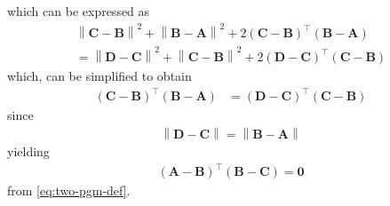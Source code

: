 \documentclass[10pt, a4paper]{article}
\providecommand{\norm}[1]{\left\lVert#1\right\rVert}
\let\vec\mathbf
\begin{document}
which can be expressed as
\begin{multline}
	\norm{\vec{C}-\vec{B}}^2 + \norm{\vec{B}-\vec{A}}^2 + 2(\vec{C}-\vec{B})^{\top} (\vec{B}-\vec{A}) 
	\\
	= \norm{\vec{D}-\vec{C}}^2 + \norm{\vec{C}-\vec{B}}^2+2(\vec{D}-\vec{C})^{\top} (\vec{C}-\vec{B}) 
\end{multline}
which, can be simplified to obtain 
\begin{align}
	(\vec{C}-\vec{B})^{\top} (\vec{B}-\vec{A})&=(\vec{D}-\vec{C})^{\top} (\vec{C}-\vec{B}) 
\end{align}
since 
\begin{align}
\norm{\vec{D}-\vec{C}} =   
\norm{\vec{B}-\vec{A}}   
\end{align}
yielding 
\begin{align}
	(\vec{A}-\vec{B})^{\top} (\vec{B}-\vec{C})=\vec{0}
\end{align}
	  from \eqref{eq:two-pgm-def}.  
\end{document}
